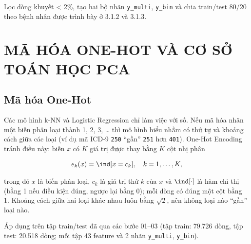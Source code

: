 \documentclass[a4paper]{report}
\begin{document}
Lọc dòng khuyết < 2\%, tạo hai bộ nhãn \texttt{y\_\allowbreak{}multi}, \texttt{y\_\allowbreak{}bin} và chia train/test 80/20 theo bệnh nhân được trình bày ở 3.1.2 và 3.1.3.


\section{MÃ HÓA ONE-HOT VÀ CƠ SỞ TOÁN HỌC PCA}

\subsection{Mã hóa One-Hot}

Các mô hình k-NN và Logistic Regression chỉ làm việc với số. Nếu mã hóa nhãn một biến phân loại thành 1, 2, 3, … thì mô hình hiểu nhầm có thứ tự và khoảng cách giữa các loại (ví dụ mã ICD-9 \texttt{250} “gần” \texttt{251} hơn \texttt{401}). One-Hot Encoding tránh điều này: biến $x$ có $K$ giá trị được thay bằng $K$ cột nhị phân

\begin{equation}
  e_k(x) = \ind[x = c_k],\quad k = 1,\dots,K,
\end{equation}

trong đó $x$ là biến phân loại, $c_k$ là giá trị thứ $k$ của $x$ và $\ind[\cdot]$ là hàm chỉ thị (bằng 1 nếu điều kiện đúng, ngược lại bằng 0); mỗi dòng có đúng một cột bằng 1. Khoảng cách giữa hai loại khác nhau luôn bằng $\sqrt{2}$, nên không loại nào “gần” loại nào.

Áp dụng trên tập train/test đã qua các bước 01–03 (tập train: 79.726 dòng, tập test: 20.518 dòng; mỗi tập 43 feature và 2 nhãn \texttt{y\_\allowbreak{}multi}, \texttt{y\_\allowbreak{}bin}).
\end{document}
